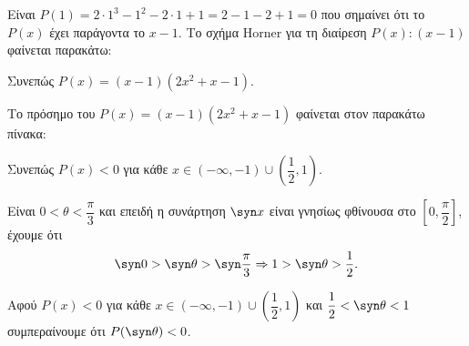 \begin{alist}
\item Είναι $P(1) = 2 \cdot 1^3 - 1^2 - 2 \cdot 1 + 1 = 2 - 1 - 2 + 1 = 0$ που σημαίνει ότι το $P(x)$ έχει παράγοντα το $x - 1$. Το σχήμα Horner για τη διαίρεση $P(x) : (x - 1)$ φαίνεται παρακάτω:
\begin{center}
\end{center}
Συνεπώς $P(x) = (x - 1)(2x^2 + x - 1)$.
\item Το πρόσημο του $P(x) = (x - 1)(2x^2 + x - 1)$ φαίνεται στον παρακάτω πίνακα:
\begin{center}
\end{center}
Συνεπώς $P(x) < 0$ για κάθε $x \in (-\infty, -1) \cup \left(\dfrac{1}{2}, 1\right)$.
\item Είναι $0 < \theta < \dfrac{\pi}{3}$ και επειδή η συνάρτηση $\syn  x$ είναι γνησίως φθίνουσα στο $\left[0, \dfrac{\pi}{2}\right]$, έχουμε ότι
\[\syn  0 > \syn \theta > \syn \frac{\pi}{3} \Rightarrow 1 > \syn \theta > \frac{1}{2}.\]
\item Αφού $P(x) < 0$ για κάθε $x \in (-\infty, -1) \cup \left(\dfrac{1}{2}, 1\right)$ και $\dfrac{1}{2} < \syn \theta < 1$ συμπεραίνουμε ότι $P(\syn \theta) < 0$.
\end{alist}

